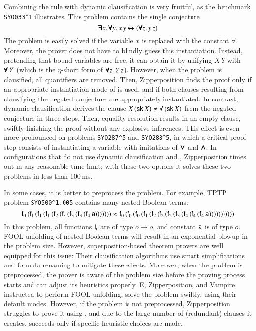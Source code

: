 Combining the rule  with dynamic clausification is very fruitful, as
the benchmark \texttt{SYO033\^{}1} illustrates. This problem contains the
single conjecture
$$ \pmb{\exists} x. \, \pmb{\forall} y.  \, x \, y \pmb{\leftrightarrow} (\pmb{\forall} z. \, y \,z)$$ The
problem is easily solved if the variable $x$ is replaced with the constant $\forall$.
Moreover, the prover does not have to blindly guess this instantiation. Instead,
pretending that bound variables are free, it can obtain it by unifying $  X \, Y
$ with $ \pmb{\forall} \, Y$ (which is the $\eta$-short form of $\pmb{\forall} z. \, Y
\,z$). However, when the problem is clausified, all quantifiers are removed.
Then, Zipperposition finds the proof only if an appropriate instantiation mode of
 is used, and if both clauses resulting from clausifying the negated
conjecture are appropriately instantiated. In contrast, dynamic clausification
derives the clause $ X \, (\cst{sk} \, X) \not\eq \forall \, (\cst{sk} \, X) $
from the negated conjecture in three steps. Then, equality resolution results in
an empty clause, swiftly finishing the proof without any explosive inferences.
This effect is even more pronounced on problems \verb|SYO287^5| and
\verb|SYO288^5|, in which a critical proof step consists of instantiating a variable
with imitations of $\pmb{\lor}$ and $\pmb{\land}$. In configurations that do not use dynamic
clausification and , Zipperposition times out in any reasonable
time limit; with those two options it solves these two problems in less than
100\,ms.

In some cases, it is better to preprocess the problem. For example, TPTP problem
\verb|SYO500^1.005| contains many nested Boolean terms:
$$ \mathsf{f}_0 \, ( \mathsf{f}_1 \, ( \mathsf{f}_1 \, ( \mathsf{f}_1 \, ( \mathsf{f}_2 \, ( \mathsf{f}_3 \, ( \mathsf{f}_3 \, ( \mathsf{f}_3 \, ( \mathsf{f}_4 \, \mathsf{a} ) ) ) ) ) ) ) 
    \approx \mathsf{f}_0 \, ( \mathsf{f}_0 \, ( \mathsf{f}_0 \, ( \mathsf{f}_1 \, ( \mathsf{f}_2 \, ( \mathsf{f}_2 \, ( \mathsf{f}_2 \, ( \mathsf{f}_3 \, ( \mathsf{f}_4 \, ( \mathsf{f}_4 \, ( \mathsf{f}_4 \, \mathsf{a} ) ) ) ) ) ) ) ) ) ) )$$
In this problem, all functions $\mathsf{f}_i$ are of type $o \rightarrow o$, and constant $\mathsf{a}$ is of type $o$.
FOOL unfolding of nested Boolean terms will result in an exponential blowup in the problem size. However,
superposition-based theorem provers are well equipped for this issue: Their clausification algorithms use smart simplifications and
formula renaming to mitigate these effects. Moreover, when the problem is preprocessed, the prover is aware of the problem
size before the proving process starts and can adjust its heuristics properly. E, Zipperposition, and Vampire, instructed to perform FOOL unfolding,
solve the problem swiftly, using their default modes. However, if the problem is not preprocessed, Zipperposition struggles to prove it using
, and due to the large number of (redundant) clauses it creates, succeeds only if specific heuristic choices are made.

